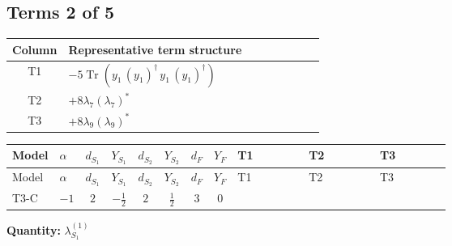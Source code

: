 \documentclass[8pt]{article}
\begin{document}
\begin{landscape}
\subsection*{Terms 2 of 5}
\begin{center}
\begin{tabular}{@{}c >{\raggedright\arraybackslash}p{0.82\linewidth}@{}}
\toprule
Column & Representative term structure \\
\midrule
T1 & \(\displaystyle -5 \operatorname{Tr}\!\left({y_1}\,\left({y_1}\right)^{\dagger}\,{y_1}\,\left({y_1}\right)^{\dagger}\right)\) \\
\midrule
T2 & \(\displaystyle +8 {\lambda_{7}} \left({\lambda_{7}}\right)^{*}\) \\
\midrule
T3 & \(\displaystyle +8 {\lambda_{9}} \left({\lambda_{9}}\right)^{*}\) \\
\midrule
\bottomrule
\end{tabular}
\end{center}
\smallskip
\tiny
\begin{longtable}{@{}llcccccc >{\raggedright\arraybackslash}p{0.21\linewidth} >{\raggedright\arraybackslash}p{0.21\linewidth} >{\raggedright\arraybackslash}p{0.21\linewidth}@{}}
\toprule
Model & $\alpha$ & $d_{S_1}$ & $Y_{S_1}$ & $d_{S_2}$ & $Y_{S_2}$ & $d_F$ & $Y_F$ & T1 & T2 & T3 \\
\midrule
\endfirsthead
\toprule
Model & $\alpha$ & $d_{S_1}$ & $Y_{S_1}$ & $d_{S_2}$ & $Y_{S_2}$ & $d_F$ & $Y_F$ & T1 & T2 & T3 \\
\midrule
\endhead
T3-C & $-1$ & $2$ & $-\frac{1}{2}$ & $2$ & $\frac{1}{2}$ & $3$ & $0$ & \scriptsize\adjustbox{max width=\linewidth}{$\begin{gathered} -5 \operatorname{Tr}\!\left({y_1}\,\left({y_1}\right)^{\dagger}\,{y_1}\,\left({y_1}\right)^{\dagger}\right)\end{gathered}$} & \scriptsize\adjustbox{max width=\linewidth}{$\begin{gathered} +8 {\lambda_{7}} \left({\lambda_{7}}\right)^{*}\end{gathered}$} & \scriptsize\adjustbox{max width=\linewidth}{$\begin{gathered} +8 {\lambda_{9}} \left({\lambda_{9}}\right)^{*}\end{gathered}$} \\
\midrule
\bottomrule
\end{longtable}
\clearpage
\noindent\textbf{Quantity: }$\lambda_{S_1}^{(1)}$\par\smallskip

\end{landscape}
\end{document}
